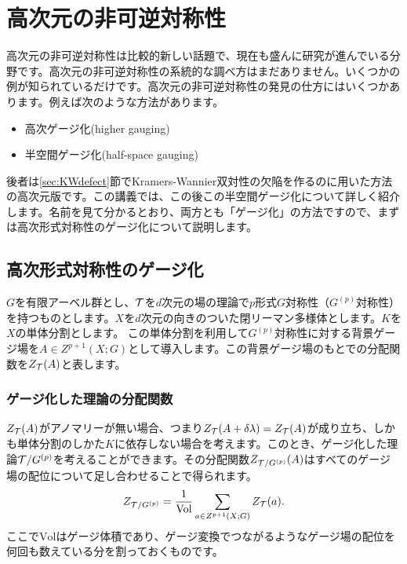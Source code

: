 \documentclass[generalized_symmetry.tex]{subfiles}
\begin{document}
\chapter{高次元の非可逆対称性}
高次元の非可逆対称性は比較的新しい話題で、現在も盛んに研究が進んでいる分野です。高次元の非可逆対称性の系統的な調べ方はまだありません。いくつかの例が知られているだけです。高次元の非可逆対称性の発見の仕方にはいくつかあります。例えば次のような方法があります。
\begin{itemize}
  \item 高次ゲージ化(higher gauging)
  \item 半空間ゲージ化(half-space gauging)
\end{itemize}
後者は\ref{sec:KWdefect}節でKramers-Wannier双対性の欠陥を作るのに用いた方法の高次元版です。この講義では、この後この半空間ゲージ化について詳しく紹介します。名前を見て分かるとおり、両方とも「ゲージ化」の方法ですので、まずは高次形式対称性のゲージ化について説明します。

\section{高次形式対称性のゲージ化}
$G$を有限アーベル群とし、$\mathcal{T}$を$d$次元の場の理論で$p$形式$G$対称性（$G^{(p)}$対称性）を持つものとします。$X$を$d$次元の向きのついた閉リーマン多様体とします。$K$を$X$の単体分割とします。
この単体分割を利用して$G^{(p)}$対称性に対する背景ゲージ場を$A\in Z^{p+1}(X;G)$として導入します。この背景ゲージ場のもとでの分配関数を$Z_{\mathcal{T}}(A)$と表します。

\subsection{ゲージ化した理論の分配関数}

$Z_{\mathcal{T}}(A)$がアノマリーが無い場合、つまり$Z_{\mathcal{T}}(A+\delta \lambda)=Z_{\mathcal{T}}(A)$が成り立ち、しかも単体分割のしかた$K$に依存しない場合を考えます。このとき、ゲージ化した理論$\mathcal{T}/G^{(p)}$を考えることができます。その分配関数$Z_{\mathcal{T}/G^{(p)}}(A)$はすべてのゲージ場の配位について足し合わせることで得られます。
\begin{align}
  Z_{\mathcal{T}/G^{(p)}} = \frac{1}{\mathrm{Vol}} \sum_{a \in Z^{p+1}(X;G)} Z_{\mathcal{T}}(a).
  \label{gaugingincochain}
\end{align}
ここで$\mathrm{Vol}$はゲージ体積であり、ゲージ変換でつながるようなゲージ場の配位を何回も数えている分を割っておくものです。
\end{document}
